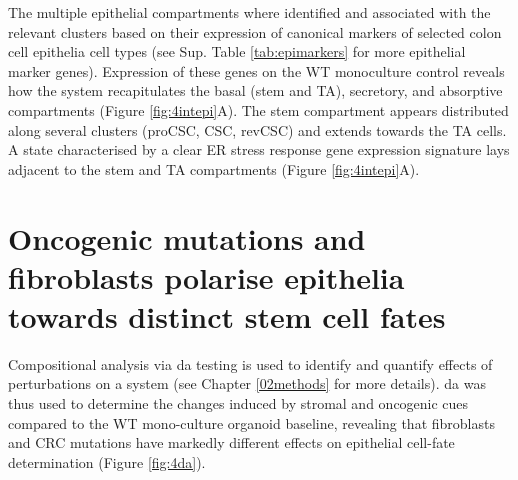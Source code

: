 The multiple epithelial compartments where identified and associated with the relevant clusters based on their expression of canonical markers of selected colon cell epithelia cell types (see Sup. Table \ref{tab:epimarkers} for more epithelial marker genes). Expression of these genes on the WT monoculture control reveals how the system recapitulates the basal (stem and TA), secretory, and absorptive compartments (Figure \ref{fig:4intepi}A). The stem compartment appears distributed along several clusters (proCSC, CSC, revCSC) and extends towards the TA cells. A state characterised by a clear ER stress response gene expression signature lays adjacent to the stem and TA compartments (Figure \ref{fig:4intepi}A).


\section{Oncogenic mutations and fibroblasts polarise epithelia towards distinct stem cell fates}

Compositional analysis via \acrfull{da} testing \cite{dann_differential_2022} is used to identify and quantify effects of perturbations on a system (see Chapter \ref{02methods} for more details). \acrshort{da} was thus used to determine the changes induced by stromal and oncogenic cues compared to the WT mono-culture organoid baseline, revealing that fibroblasts and CRC mutations have markedly different effects on epithelial cell-fate determination (Figure \ref{fig:4da}). 

